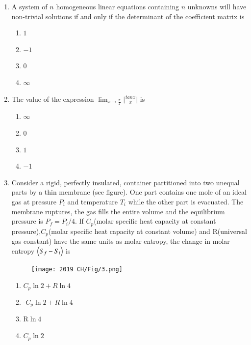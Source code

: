 \documentclass[journal,12pt,onecolumn]{IEEEtran}
\theoremstyle{remark}
\begin{document}
\begin{enumerate}
    \item A system of $n$ homogeneous linear equations containing $n$ unknowns will have non-trivial solutions if and only if the determinant of the coefficient matrix is
    
 \hfill{}
\begin{multicols}{4}
    \begin{enumerate}
        \item $1$
        \item $-1$
        \item $0$
        \item $\infty$
    \end{enumerate}
\end{multicols}

    \item The value of the expression $\lim_{x\to\frac{\pi}{2}}\big|\frac{tan x}{x}\big|$  is
    
 \hfill{}
\begin{multicols}{4}
    \begin{enumerate}
        \item $\infty$
        \item $0$
        \item $1$
        \item $-1$
    \end{enumerate}
\end{multicols}
    \item Consider a rigid, perfectly insulated, container partitioned into two unequal parts by a thin membrane (see figure). One part contains one mole of an ideal gas at pressure {$P_i$} and temperature $T_i$ while the other part is evacuated. The membrane ruptures, the gas fills the entire volume and the equilibrium pressure is $P_f = P_i/4$. If $C_p$(molar specific heat capacity at constant pressure),$C_p$(molar specific heat capacity at constant volume) and R(universal gas constant) have the same units as molar entropy, the change in molar entropy $\left(S_f - S_i\right)$ is
    
 \hfill{}
 \begin{figure}[H]
     \centering
     \texttt{[image: 2019 CH/Fig/3.png]}
     \caption{}
     \label{fig:3}
 \end{figure}

    \begin{enumerate}
        \item $C_p\ln{2} + R\ln{4}$
        \item -$C_p \ln{2} + R\ln{4}$
        \item R$\ln{4}$
        \item $C_p \ln{2}$
    \end{enumerate}


\end{enumerate}
\end{document}
